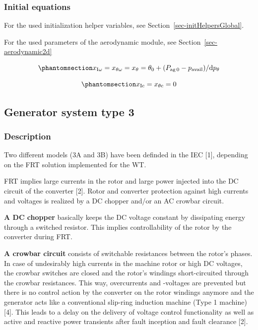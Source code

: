 \documentclass[
  a4paper,
  DIV=11,
  numbers=noendperiod]{scrartcl}
\begin{document}
\subsubsection{Initial equations}\label{initial-equations-3}

For the used initialization helper variables, see
Section~\ref{sec-initHelpersGlobal}.

For the used parameters of the aerodynamic module, see
Section~\ref{sec-aerodynamic2d}

\begin{equation}\phantomsection\label{eq-initIomega}{ 
x_\mathrm{I\omega} = x_\mathrm{\theta \omega} = x_\mathrm{\theta} = \theta_0 + (P_\mathrm{ag\,0}-p_\mathrm{avail})/\mathrm{d}p_\mathrm{\theta}
}\end{equation}

\begin{equation}\phantomsection\label{eq-initIc}{
x_\mathrm{Ic} = x_\mathrm{\theta c} = 0
}\end{equation}

\subsection{Generator system type 3}\label{generator-system-type-3}

\subsubsection{Description}\label{description}

Two different models (3A and 3B) have been definded in the IEC {[}1{]},
depending on the FRT solution implemented for the WT.

FRT implies large currents in the rotor and large power injected into
the DC circuit of the converter {[}2{]}. Rotor and converter protection
against high currents and voltages is realized by a DC chopper and/or an
AC crowbar circuit.

\textbf{A DC chopper} basically keeps the DC voltage constant by
dissipating energy through a switched resistor. This implies
controllability of the rotor by the converter during FRT.

\textbf{A crowbar circuit} consists of switchable resistances between
the rotor's phases. In case of undesirably high currents in the machine
rotor or high DC voltages, the crowbar switches are closed and the
rotor's windings short-circuited through the crowbar resistances. This
way, overcurrents and -voltages are prevented but there is no control
action by the converter on the rotor windings anymore and the generator
acts like a conventional slip-ring induction machine (Type 1 machine)
{[}4{]}. This leads to a delay on the delivery of voltage control
functionality as well as active and reactive power transients after
fault inception and fault clearance {[}2{]}.
\end{document}
